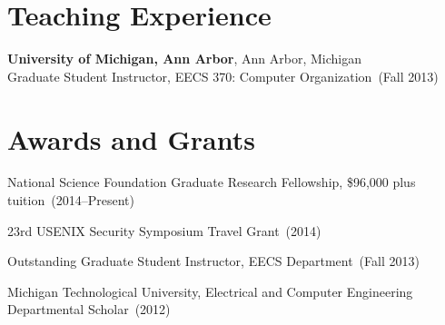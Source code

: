 \documentclass{article}
\begin{document}






\section*{Teaching Experience}
\vspace{-6pt}
{\bf University of Michigan, Ann Arbor}, Ann Arbor, Michigan \\
Graduate Student Instructor, EECS 370: Computer Organization~(Fall 2013)

\section*{Awards and Grants}
\vspace{-6pt}
National Science Foundation Graduate Research Fellowship, \$96,000 plus tuition~(2014--Present)

23rd USENIX Security Symposium Travel Grant~(2014)

Outstanding Graduate Student Instructor, EECS Department~(Fall 2013)

Michigan Technological University, Electrical and Computer Engineering Departmental Scholar~(2012)
\end{document}
